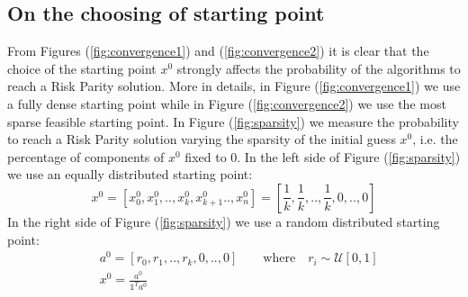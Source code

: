 \subsection{On the choosing of starting point}
From Figures (\ref{fig:convergence1}) and (\ref{fig:convergence2}) it is clear that the choice of the starting point $x^0$ strongly affects the probability of the algorithms to reach a Risk Parity solution. More in details, in Figure (\ref{fig:convergence1}) we use a fully dense starting point while in Figure (\ref{fig:convergence2}) we use the most sparse feasible starting point. In Figure (\ref{fig:sparsity}) we measure the probability to reach a Risk Parity solution varying the sparsity of the initial guess $x^0$, i.e. the percentage of components of $x^0$ fixed to 0. In the left side of Figure (\ref{fig:sparsity}) we use an equally distributed starting point:
\begin{equation}
x^{0} = [x^{0}_0, x^{0}_1, .. ,  x^{0}_k, x^{0}_{k+1} .., x^{0}_n] = [\frac{1}{k}, \frac{1}{k}, .., \frac{1}{k}, 0, .., 0]
\end{equation}
In the right side of Figure (\ref{fig:sparsity}) we use a random distributed starting point:
\begin{equation}
\begin{aligned}
&a^{0} = [r_0, r_1, ..,r_k, 0, .., 0] \qquad \text{where} \quad r_i \sim \mathcal{U}[0,1]\\
&x^0 = \frac{a^{0}}{\mathds{1}^T a^0}
\end{aligned}
\end{equation}

